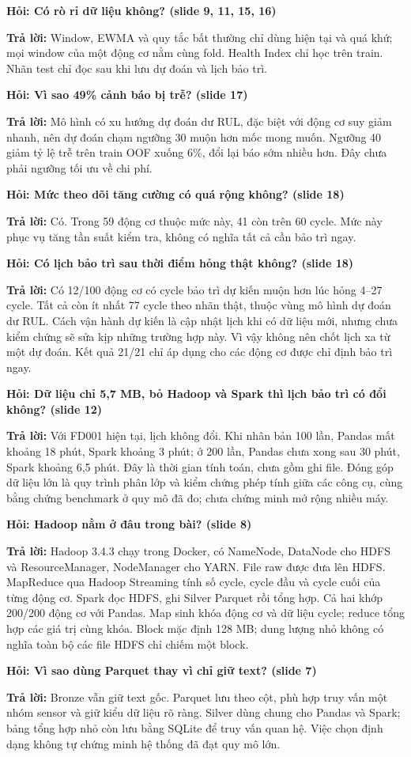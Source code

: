 \documentclass[11pt,a4paper]{article}
\newcommand{\qa}[2]{\par\medskip\noindent\textbf{\textcolor{iuhblue}{Hỏi:} #1}\par\noindent\textbf{Trả lời:} #2\par}
\begin{document}
\qa{Có rò rỉ dữ liệu không? (slide 9, 11, 15, 16)}{Window, EWMA và quy tắc bất
thường chỉ dùng hiện tại và quá khứ; mọi window của một động cơ nằm cùng fold.
Health Index chỉ học trên train. Nhãn test chỉ đọc sau khi lưu dự đoán và lịch bảo trì.}

\qa{Vì sao 49\% cảnh báo bị trễ? (slide 17)}{Mô hình có xu hướng dự đoán dư RUL,
đặc biệt với động cơ suy giảm nhanh, nên dự đoán chạm ngưỡng 30 muộn hơn mốc mong
muốn. Ngưỡng 40 giảm tỷ lệ trễ trên train OOF xuống 6\%, đổi lại báo sớm nhiều hơn.
Đây chưa phải ngưỡng tối ưu về chi phí.}

\qa{Mức theo dõi tăng cường có quá rộng không? (slide 18)}{Có. Trong 59 động cơ
thuộc mức này, 41 còn trên 60 cycle. Mức này phục vụ tăng tần suất kiểm tra,
không có nghĩa tất cả cần bảo trì ngay.}

\qa{Có lịch bảo trì sau thời điểm hỏng thật không? (slide 18)}{Có 12/100 động cơ
có cycle bảo trì dự kiến muộn hơn lúc hỏng 4--27 cycle. Tất cả còn ít nhất 77
cycle theo nhãn thật, thuộc vùng mô hình dự đoán dư RUL. Cách vận hành dự kiến
là cập nhật lịch khi có dữ liệu mới, nhưng chưa kiểm chứng sẽ sửa kịp những
trường hợp này. Vì vậy không nên chốt lịch xa từ một dự đoán. Kết quả 21/21 chỉ
áp dụng cho các động cơ được chỉ định bảo trì ngay.}

\qa{Dữ liệu chỉ 5,7 MB, bỏ Hadoop và Spark thì lịch bảo trì có đổi không? (slide 12)}
{Với FD001 hiện tại, lịch không đổi. Khi nhân bản 100 lần, Pandas mất khoảng 18
phút, Spark khoảng 3 phút; ở 200 lần, Pandas chưa xong sau 30 phút, Spark khoảng
6,5 phút. Đây là thời gian tính toán, chưa gồm ghi file. Đóng góp dữ liệu lớn là
quy trình phân lớp và kiểm chứng phép tính giữa các công cụ, cùng bằng chứng
benchmark ở quy mô đã đo; chưa chứng minh mở rộng nhiều máy.}

\qa{Hadoop nằm ở đâu trong bài? (slide 8)}{Hadoop 3.4.3 chạy trong Docker, có
NameNode, DataNode cho HDFS và ResourceManager, NodeManager cho YARN. File raw
được đưa lên HDFS. MapReduce qua Hadoop Streaming tính số cycle, cycle đầu và
cycle cuối của từng động cơ. Spark đọc HDFS, ghi Silver Parquet rồi tổng hợp.
Cả hai khớp 200/200 động cơ với Pandas. Map sinh khóa động cơ và dữ liệu cycle;
reduce tổng hợp các giá trị cùng khóa. Block mặc định 128 MB; dung lượng nhỏ không
có nghĩa toàn bộ các file HDFS chỉ chiếm một block.}

\qa{Vì sao dùng Parquet thay vì chỉ giữ text? (slide 7)}{Bronze vẫn giữ text gốc.
Parquet lưu theo cột, phù hợp truy vấn một nhóm sensor và giữ kiểu dữ liệu rõ ràng.
Silver dùng chung cho Pandas và Spark; bảng tổng hợp nhỏ còn lưu bằng SQLite để
truy vấn quan hệ. Việc chọn định dạng không tự chứng minh hệ thống đã đạt quy mô lớn.}
\end{document}
